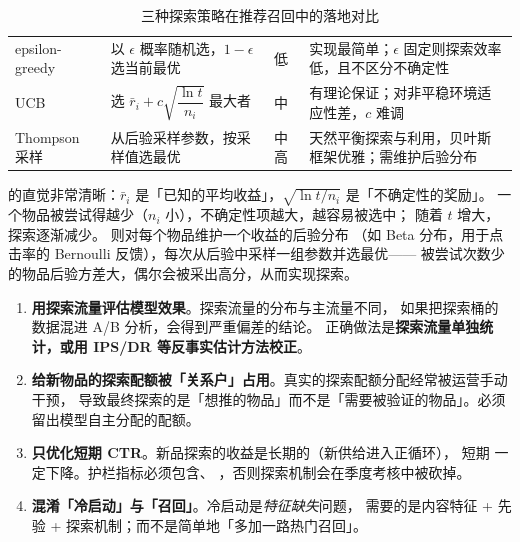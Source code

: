 \begin{table}[htbp]
\centering
\caption{三种探索策略在推荐召回中的落地对比}
\label{tab:explore}
\small
\begin{tabularx}{\textwidth}{L{2.2cm} L{3.3cm} L{2.0cm} Y}
\toprule
{} &  &  &  \\
\midrule
epsilon-greedy & 以 $\epsilon$ 概率随机选，$1-\epsilon$ 选当前最优 &
低 & 实现最简单；$\epsilon$ 固定则探索效率低，且不区分不确定性 \\
UCB & 选 $\bar r_i + c\sqrt{\dfrac{\ln t}{n_i}}$ 最大者 &
中 & 有理论保证；对非平稳环境适应性差，$c$ 难调 \\
Thompson 采样 & 从后验采样参数，按采样值选最优 &
中高 & 天然平衡探索与利用，贝叶斯框架优雅；需维护后验分布 \\
\bottomrule
\end{tabularx}
\end{table}

 的直觉非常清晰：$\bar r_i$ 是「已知的平均收益」，$\sqrt{\ln t / n_i}$ 是「不确定性的奖励」。
一个物品被尝试得越少（$n_i$ 小），不确定性项越大，越容易被选中；
随着 $t$ 增大，探索逐渐减少。 则对每个物品维护一个收益的后验分布
（如 Beta 分布，用于点击率的 Bernoulli 反馈），每次从后验中采样一组参数并选最优——
被尝试次数少的物品后验方差大，偶尔会被采出高分，从而实现探索。

\begin{pitfall}[冷启动的四个常见错误]
\begin{enumerate}
  \item \textbf{用探索流量评估模型效果}。探索流量的分布与主流量不同，
        如果把探索桶的数据混进 A/B 分析，会得到严重偏差的结论。
        正确做法是\textbf{探索流量单独统计，或用 IPS/DR 等反事实估计方法校正}。
  \item \textbf{给新物品的探索配额被「关系户」占用}。真实的探索配额分配经常被运营手动干预，
        导致最终探索的是「想推的物品」而不是「需要被验证的物品」。必须留出模型自主分配的配额。
  \item \textbf{只优化短期 CTR}。新品探索的收益是长期的（新供给进入正循环），
        短期  一定下降。护栏指标必须包含、
        ，否则探索机制会在季度考核中被砍掉。
  \item \textbf{混淆「冷启动」与「召回」}。冷启动是\emph{特征缺失}问题，
        需要的是内容特征 + 先验 + 探索机制；而不是简单地「多加一路热门召回」。
\end{enumerate}
\end{pitfall}

